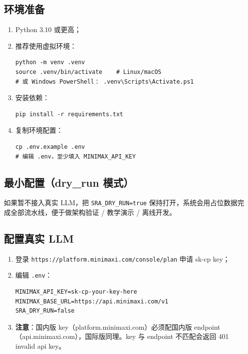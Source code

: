 \documentclass[11pt,a4paper]{article}
\begin{document}
\subsection{环境准备}

\begin{enumerate}[leftmargin=2em]
\item Python 3.10 或更高；
\item 推荐使用虚拟环境：
\begin{verbatim}
python -m venv .venv
source .venv/bin/activate    # Linux/macOS
# 或 Windows PowerShell： .venv\Scripts\Activate.ps1
\end{verbatim}
\item 安装依赖：
\begin{verbatim}
pip install -r requirements.txt
\end{verbatim}
\item 复制环境配置：
\begin{verbatim}
cp .env.example .env
# 编辑 .env，至少填入 MINIMAX_API_KEY
\end{verbatim}
\end{enumerate}

\subsection{最小配置（dry\_run 模式）}

如果暂不接入真实 LLM，把 \texttt{SRA\_DRY\_RUN=true} 保持打开，系统会用占位数据完成全部流水线，便于做架构验证 / 教学演示 / 离线开发。

\subsection{配置真实 LLM}

\begin{enumerate}[leftmargin=2em]
\item 登录 \texttt{https://platform.minimaxi.com/console/plan} 申请 sk-cp key；
\item 编辑 \texttt{.env}：
\begin{verbatim}
MINIMAX_API_KEY=sk-cp-your-key-here
MINIMAX_BASE_URL=https://api.minimaxi.com/v1
SRA_DRY_RUN=false
\end{verbatim}
\item \textbf{注意}：国内版 key（platform.minimaxi.com）必须配国内版 endpoint（api.minimaxi.com），国际版同理。key 与 endpoint 不匹配会返回 401 invalid api key。
\end{enumerate}
\end{document}

